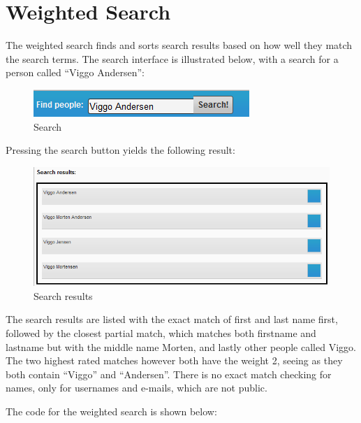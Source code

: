 \section{Weighted Search}
The weighted search finds and sorts search results based on how well they match the search terms. 
The search interface is illustrated below, with a search for a person called ``Viggo Andersen'':
\begin{figure}[h]
	\centering
		\includegraphics{implementation/figures/search.png}
	\caption{Search}
	\label{fig:search}
\end{figure}

Pressing the search button yields the following result:
\begin{figure}[h]
	\centering
		\includegraphics[scale = 0.65]{implementation/figures/results.png}
	\caption{Search results}
	\label{fig:searchresults}
\end{figure}

The search results are listed with the exact match of first and last name first, followed by the closest partial match, which matches both firstname and lastname but with the middle name Morten, and lastly other people called Viggo. The two highest rated matches however both have the weight 2, seeing as they both contain ``Viggo'' and ``Andersen''. There is no exact match checking for names, only for usernames and e-mails, which are not public.

The code for the weighted search is shown below:


